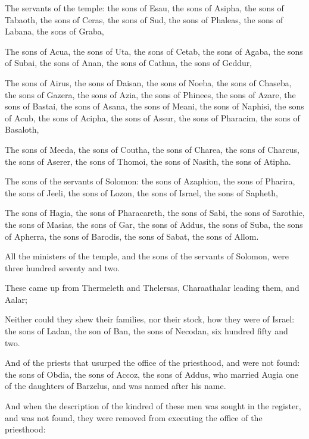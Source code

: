 {\par }{\PP {}The servants of the temple: the sons of Esau, the sons of Asipha, the sons of Tabaoth, the sons of Ceras, the sons of Sud, the sons of Phaleas, the sons of Labana, the sons of Graba,
\par }{\PP {}The sons of Acua, the sons of Uta, the sons of Cetab, the sons of Agaba, the sons of Subai, the sons of Anan, the sons of Cathua, the sons of Geddur,
\par }{\PP {}The sons of Airus, the sons of Daisan, the sons of Noeba, the sons of Chaseba, the sons of Gazera, the sons of Azia, the sons of Phinees, the sons of Azare, the sons of Bastai, the sons of Asana, the sons of Meani, the sons of Naphisi, the sons of Acub, the sons of Acipha, the sons of Assur, the sons of Pharacim, the sons of Basaloth,
\par }{\PP {}The sons of Meeda, the sons of Coutha, the sons of Charea, the sons of Charcus, the sons of Aserer, the sons of Thomoi, the sons of Nasith, the sons of Atipha.
\par }{\PP {}The sons of the servants of Solomon: the sons of Azaphion, the sons of Pharira, the sons of Jeeli, the sons of Lozon, the sons of Israel, the sons of Sapheth,
\par }{\PP {}The sons of Hagia, the sons of Pharacareth, the sons of Sabi, the sons of Sarothie, the sons of Masias, the sons of Gar, the sons of Addus, the sons of Suba, the sons of Apherra, the sons of Barodis, the sons of Sabat, the sons of Allom.
\par }{\PP {}All the ministers of the temple, and the sons of the servants of Solomon, were three hundred seventy and two.
\par }{\PP {}These came up from Thermeleth and Thelersas, Charaathalar leading them, and Aalar;
\par }{\PP {}Neither could they shew their families, nor their stock, how they were of Israel: the sons of Ladan, the son of Ban, the sons of Necodan, six hundred fifty and two.
\par }{\PP {}And of the priests that usurped the office of the priesthood, and were not found: the sons of Obdia, the sons of Accoz, the sons of Addus, who married Augia one of the daughters of Barzelus, and was named after his name.
\par }{\PP {}And when the description of the kindred of these men was sought in the register, and was not found, they were removed from executing the office of the priesthood:
}
